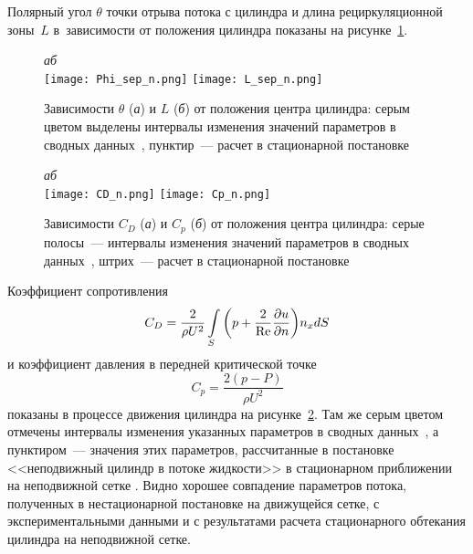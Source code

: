 Полярный угол $\theta$ точки отрыва потока с цилиндра и длина рециркуляционной зоны~$L$ в~зависимости от 
положения цилиндра показаны на рисунке~\ref{fig1:5}.
\begin{figure}[t!]
  \label{fig1:5}
  \centering\small \emph{а}\hspace*{79mm}\emph{б}\\
  {\texttt{[image: Phi\_sep\_n.png]}}\hfill
  {\texttt{[image: L\_sep\_n.png]}}
  \caption{Зависимости $\theta$ (\emph{а}) и $L$ (\emph{б}) от положения центра цилиндра: серым 
           цветом выделены интервалы изменения значений параметров в сводных 
           данных~\cite{takami,dennis,belocirk,tuan,braza,coutan,tritt}, 
           пунктир~--- расчет в стационарной постановке \cite{Cher}}
\end{figure}
\begin{figure}[t!]\vspace*{2mm}
  \label{fig1:6}
  \centering\small \emph{а}\hspace*{79mm}\emph{б}\\
  {\texttt{[image: CD\_n.png]}}\hfill
  {\texttt{[image: Cp\_n.png]}}
  \caption{Зависимости $C_D$ (\emph{а}) и $C_p$ (\emph{б}) от положения центра цилиндра: серые 
           полосы~--- интервалы изменения значений параметров в сводных 
           данных~\cite{takami,dennis,belocirk,tuan,braza,coutan,tritt},
           штрих~--- расчет в стационарной постановке \cite{Cher}}
\end{figure}
Коэффициент сопротивления
\begin{equation*}
  C_{D} = \frac{2}{{\rho U^2}}\int\limits_S {\left( {p + \frac{2}{{{\mathop{\rm Re}\nolimits} }}
          \frac{{\partial u}}{{\partial n}}} \right)} n_x dS
\end{equation*}
и коэффициент давления  в передней критической точке
\begin{equation*}
  C_p=\frac{2(p-P)}{\rho U^2}
\end{equation*}
показаны в процессе движения цилиндра на рисунке~\ref{fig1:6}. Там же серым цветом отмечены интервалы 
изменения указанных параметров в сводных 
данных~\cite{takami,dennis,belocirk,tuan,braza,coutan,tritt}, а пунктиром~--- значения этих 
параметров, рассчитанные в постановке <<неподвижный цилиндр в потоке жидкости>> в стационарном приближении на 
неподвижной сетке \cite{Cher}. Видно хорошее совпадение параметров потока, полученных в нестационарной 
постановке на движущейся сетке, с экспериментальными данными и с результатами расчета стационарного обтекания 
цилиндра на неподвижной сетке.

